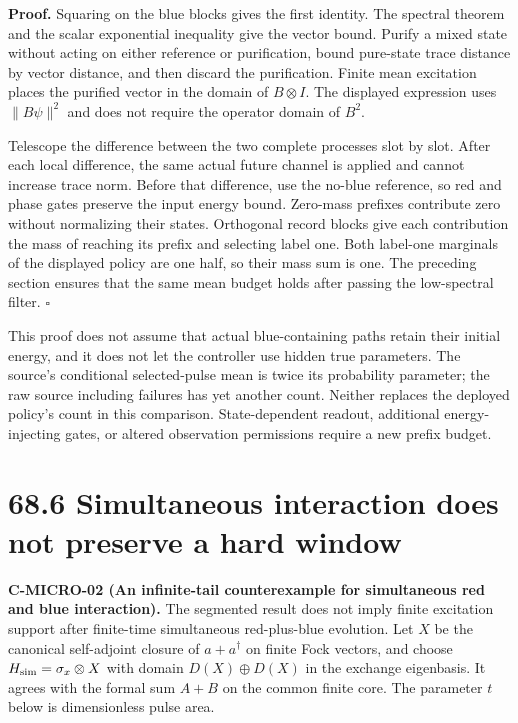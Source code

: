\documentclass[
  11pt,
  oneside]{book}
\begin{document}
\textbf{Proof.} Squaring on the blue blocks gives the first identity.
The spectral theorem and the scalar exponential inequality give the
vector bound. Purify a mixed state without acting on either reference or
purification, bound pure-state trace distance by vector distance, and
then discard the purification. Finite mean excitation places the
purified vector in the domain of \(B\otimes I\). The displayed
expression uses \(\|B\psi\|^2\) and does not require the operator domain
of \(B^2\).

Telescope the difference between the two complete processes slot by
slot. After each local difference, the same actual future channel is
applied and cannot increase trace norm. Before that difference, use the
no-blue reference, so red and phase gates preserve the input energy
bound. Zero-mass prefixes contribute zero without normalizing their
states. Orthogonal record blocks give each contribution the mass of
reaching its prefix and selecting label one. Both label-one marginals of
the displayed policy are one half, so their mass sum is one. The
preceding section ensures that the same mean budget holds after passing
the low-spectral filter. \(\square\)

This proof does not assume that actual blue-containing paths retain
their initial energy, and it does not let the controller use hidden true
parameters. The source's conditional selected-pulse mean is twice its
probability parameter; the raw source including failures has yet another
count. Neither replaces the deployed policy's count in this comparison.
State-dependent readout, additional energy-injecting gates, or altered
observation permissions require a new prefix budget.

\section{68.6 Simultaneous interaction does not preserve a hard window}

\label{c-micro-02}{}

\textbf{C-MICRO-02 (An infinite-tail counterexample for simultaneous red
and blue interaction).} The segmented result does not imply finite
excitation support after finite-time simultaneous red-plus-blue
evolution. Let \(X\) be the canonical self-adjoint closure of
\(a+a^\dagger\) on finite Fock vectors, and choose
\(H_{\rm sim}=\sigma_x\otimes X\) with domain \(D(X)\oplus D(X)\) in the
exchange eigenbasis. It agrees with the formal sum \(A+B\) on the common
finite core. The parameter \(t\) below is dimensionless pulse area.
\end{document}
